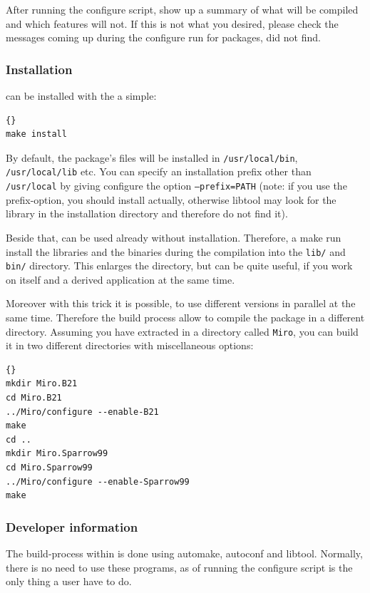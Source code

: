 \documentclass[10pt]{book}
\begin{document}
After running the configure script, \miro show up a summary of what
will be compiled and which features will not. If this is not what you
desired, please check the messages coming up during the configure run
for packages, \miro did not find.

\subsubsection{Installation}

\miro can be installed with the a simple:

\begin{lstlisting}[frame=tb]{}
make install
\end{lstlisting}

By default, the package's files will be installed in \texttt{/usr/local/bin},
\texttt{/usr/local/lib} etc.  You can specify an installation prefix other
than \texttt{/usr/local} by giving configure the option
\texttt{--prefix=PATH} (note: if you use the prefix-option, you should
install \miro actually, otherwise libtool may look for the library in
the installation directory and therefore do not find it).

Beside that, \miro can be used already without installation. Therefore,
a make run install the libraries and the binaries during the
compilation into the \texttt{lib/} and \texttt{bin/} directory. This
enlarges the \miro directory, but can be quite useful, if you work on
\miro itself and a derived application at the same time.

Moreover with this trick it is possible, to use different \miro
versions in parallel at the same time. Therefore the build process
allow to compile the package in a different directory. Assuming you
have extracted \miro in a directory called \texttt{Miro}, you can
build it in two different directories with miscellaneous options:

\begin{lstlisting}[frame=tb]{}
mkdir Miro.B21
cd Miro.B21
../Miro/configure --enable-B21
make
cd ..
mkdir Miro.Sparrow99
cd Miro.Sparrow99
../Miro/configure --enable-Sparrow99
make
\end{lstlisting}

\subsubsection{Developer information}

The build-process within \miro is done using automake, autoconf and
libtool. Normally, there is no need to use these programs, as of
running the configure script is the only thing a user have to do.
\end{document}
